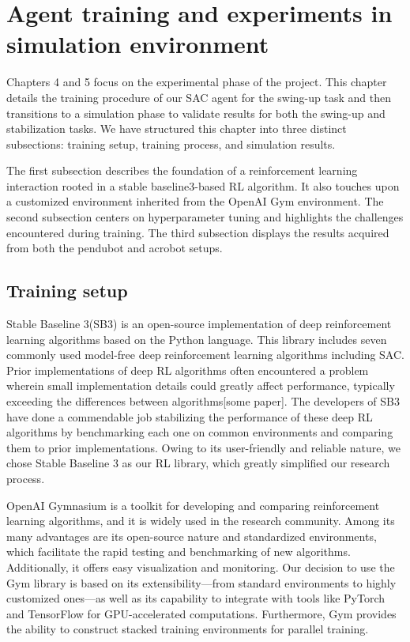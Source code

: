 \chapter{Agent training and experiments in simulation environment}
Chapters 4 and 5 focus on the experimental phase of the project. This chapter details the training procedure of our SAC agent for the swing-up task and then transitions to a simulation phase to validate results for both the swing-up and stabilization tasks. We have structured this chapter into three distinct subsections: training setup, training process, and simulation results.

The first subsection describes the foundation of a reinforcement learning interaction rooted in a stable baseline3-based RL algorithm. It also touches upon a customized environment inherited from the OpenAI Gym environment. The second subsection centers on hyperparameter tuning and highlights the challenges encountered during training. The third subsection displays the results acquired from both the pendubot and acrobot setups.

\section{Training setup}
Stable Baseline 3(SB3)\cite{stable-baselines3} is an open-source implementation of deep reinforcement learning algorithms based on the Python language. This library includes seven commonly used model-free deep reinforcement learning algorithms including SAC. Prior implementations of deep RL algorithms often encountered a problem wherein small implementation details could greatly affect performance, typically exceeding the differences between algorithms[some paper]. The developers of SB3 have done a commendable job stabilizing the performance of these deep RL algorithms by benchmarking each one on common environments and comparing them to prior implementations. Owing to its user-friendly and reliable nature, we chose Stable Baseline 3 as our RL library, which greatly simplified our research process.

OpenAI Gymnasium\cite{towers_gymnasium_2023} is a toolkit for developing and comparing reinforcement learning algorithms, and it is widely used in the research community. Among its many advantages are its open-source nature and standardized environments, which facilitate the rapid testing and benchmarking of new algorithms. Additionally, it offers easy visualization and monitoring. Our decision to use the Gym library is based on its extensibility—from standard environments to highly customized ones—as well as its capability to integrate with tools like PyTorch and TensorFlow for GPU-accelerated computations. Furthermore, Gym provides the ability to construct stacked training environments for parallel training.

